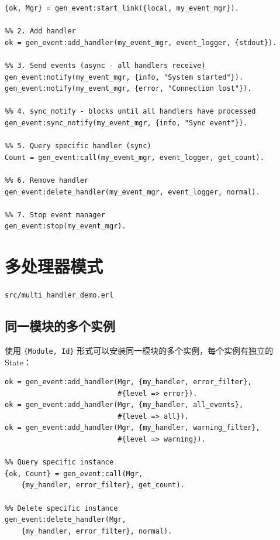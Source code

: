 \documentclass[a4paper,11pt]{article}
\begin{document}
\begin{lstlisting}[style=erlangstyle]
%% 1. Start event manager
{ok, Mgr} = gen_event:start_link({local, my_event_mgr}).

%% 2. Add handler
ok = gen_event:add_handler(my_event_mgr, event_logger, {stdout}).

%% 3. Send events (async - all handlers receive)
gen_event:notify(my_event_mgr, {info, "System started"}).
gen_event:notify(my_event_mgr, {error, "Connection lost"}).

%% 4. sync_notify - blocks until all handlers have processed
gen_event:sync_notify(my_event_mgr, {info, "Sync event"}).

%% 5. Query specific handler (sync)
Count = gen_event:call(my_event_mgr, event_logger, get_count).

%% 6. Remove handler
gen_event:delete_handler(my_event_mgr, event_logger, normal).

%% 7. Stop event manager
gen_event:stop(my_event_mgr).
\end{lstlisting}


\section{多处理器模式}

\begin{notebox}[源码文件]
\texttt{src/multi\_handler\_demo.erl}
\end{notebox}

\subsection{同一模块的多个实例}

使用 \texttt{\{Module, Id\}} 形式可以安装同一模块的多个实例，每个实例有独立的 State：

\begin{lstlisting}[style=erlangstyle]
%% Add 3 instances of the same handler module
ok = gen_event:add_handler(Mgr, {my_handler, error_filter},
                           #{level => error}).
ok = gen_event:add_handler(Mgr, {my_handler, all_events},
                           #{level => all}).
ok = gen_event:add_handler(Mgr, {my_handler, warning_filter},
                           #{level => warning}).

%% Query specific instance
{ok, Count} = gen_event:call(Mgr,
    {my_handler, error_filter}, get_count).

%% Delete specific instance
gen_event:delete_handler(Mgr,
    {my_handler, error_filter}, normal).
\end{lstlisting}
\end{document}
